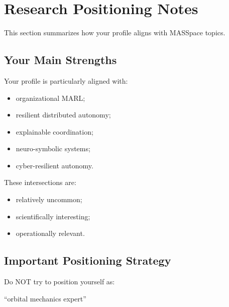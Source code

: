 \documentclass[10pt,a4paper,twocolumn]{article}
\begin{document}


\section{Research Positioning Notes}

This section summarizes how your profile aligns with MASSpace topics.


\subsection{Your Main Strengths}

Your profile is particularly aligned with:
\begin{itemize}
    \item organizational MARL;
    \item resilient distributed autonomy;
    \item explainable coordination;
    \item neuro-symbolic systems;
    \item cyber-resilient autonomy.
\end{itemize}

These intersections are:
\begin{itemize}
    \item relatively uncommon;
    \item scientifically interesting;
    \item operationally relevant.
\end{itemize}


\subsection{Important Positioning Strategy}

Do NOT try to position yourself as:
\begin{center}
    ``orbital mechanics expert''
\end{center}
\end{document}
